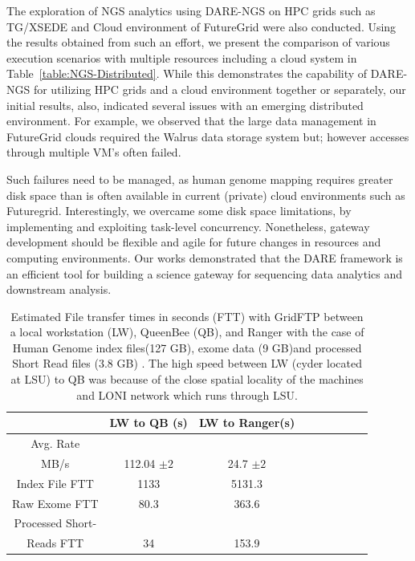 \documentclass[]{svjour3}
\begin{document}
The exploration of NGS analytics using DARE-NGS 
on HPC grids such as TG/XSEDE and Cloud environment of
FutureGrid were also conducted\cite{ecmls11}. Using the results obtained from such an
effort, we present the comparison of various execution scenarios with
multiple resources including a cloud system in
Table~\ref{table:NGS-Distributed}. While this demonstrates the
capability of DARE-NGS for utilizing HPC grids and a cloud environment
together or separately, our initial results, also, indicated several
issues with an emerging distributed environment. For example, we
observed that the large data management in FutureGrid clouds required
the Walrus data storage system but; however accesses through multiple VM's
often failed.

Such failures need to be managed, as human genome mapping requires
greater disk space than is often available in current (private) cloud
environments such as Futuregrid. Interestingly, we overcame some disk
space limitations, by implementing and exploiting task-level
concurrency. Nonetheless, gateway development should be flexible and
agile for future changes in resources and computing environments. Our works demonstrated that the DARE framework is an efficient tool for building a science gateway for sequencing data analytics and downstream analysis.

 \begin{table}
\centering
 \small
 \begin{tabular}{|c|c|c|c|c|c|c|c|c|} 
 \hline  
 	          & LW to QB (s)  & LW to Ranger(s) \\
 \hline                       
Avg. Rate && \\
MB/s & 112.04 $\pm 2$ &	    24.7 $\pm 2$  \\
 \hline                       
Index File	FTT & 1133  &	    5131.3      \\        
 \hline                       
Raw 	 Exome FTT&80.3 & 363.6\\                  
 \hline                       
Processed Short-&    & \\
Reads FTT&34&153.9  \\
 \hline                       
                    
\end{tabular}


\caption{Estimated File transfer times in seconds (FTT) with GridFTP between a local workstation (LW), QueenBee (QB), and Ranger with the case of Human Genome index files(127 GB), exome data (9 GB)and processed Short Read files (3.8 GB) . The high speed between LW (cyder located at LSU) to QB was because of the close spatial locality of the machines and LONI network which runs through LSU.  }

 \label{table:NGS-Distributed-file} 
\end{table}
\end{document}
